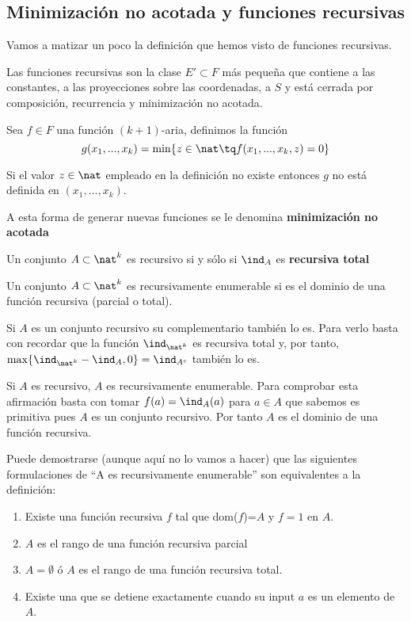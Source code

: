 \subsection{Minimización no acotada y funciones recursivas}
Vamos a matizar un poco la definición que hemos visto de funciones recursivas.

\begin{defn}
Las funciones recursivas son la clase $E'\subset F$ más pequeña que contiene a las constantes, a las proyecciones sobre las coordenadas, a $S$ y está cerrada por composición, recurrencia y minimización no acotada.
\end{defn}

\begin{defn}
Sea $f\in F$ una función $(k+1)$-aria, definimos la función
\[g(x_1,...,x_k)= \min\{z \in \nat \tq f(x_1,...,x_k,z)=0\}\]

Si el valor $z \in \nat$ empleado en la definición no existe entonces $g$ no está definida en $(x_1,...,x_k)$.

A esta forma de generar nuevas funciones se le denomina \textbf{minimización no acotada}

\end{defn}

\begin{defn}
Un conjunto $A \subset \nat^k$ es recursivo si y sólo si $\ind_A$ es \textbf{recursiva total}
\end{defn}

\begin{defn}
Un conjunto $A \subset \nat^k$ es recursivamente enumerable si es el dominio de una función recursiva (parcial o total).
\end{defn}

\obs Si $A$ es un conjunto recursivo su complementario también lo es. Para verlo basta con recordar que la función $\ind_{\nat^k}$ es recursiva total y, por tanto, $\max\{\ind_{\nat^k}-\ind_A,0\}=\ind_{A^c}$ también lo es.

\obs Si $A$ es recursivo, $A$ es recursivamente enumerable. Para comprobar esta afirmación basta con tomar $f(a)=\ind_A(a)$ para $a\in A$ que sabemos es primitiva pues $A$ es un conjunto recursivo. Por tanto $A$ es el dominio de una función recursiva.

Puede demostrarse (aunque aquí no lo vamos a hacer) que las siguientes formulaciones de ``A es recursivamente enumerable'' son equivalentes a la definición:
\begin{enumerate}
\item Existe una función recursiva $f$ tal que dom($f$)=$A$ y $f=1$ en $A$.
\item $A$ es el rango de una función recursiva parcial
\item $A=\emptyset$ ó $A$ es el rango de una función recursiva total.
\item Existe una \MT que se detiene exactamente cuando su input $a$ es un elemento de $A$.
\end{enumerate}

